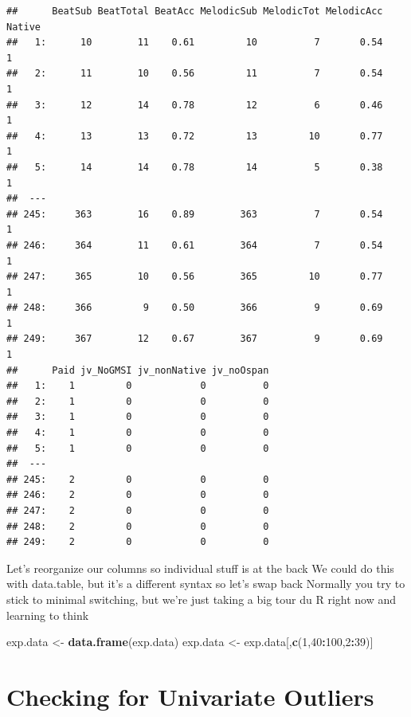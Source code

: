 \documentclass[]{book}
\newenvironment{Shaded}{\begin{snugshade}}{\end{snugshade}}
\newcommand{\KeywordTok}[1]{\textcolor[rgb]{0.13,0.29,0.53}{\textbf{#1}}}
\newcommand{\DecValTok}[1]{\textcolor[rgb]{0.00,0.00,0.81}{#1}}
\newcommand{\StringTok}[1]{\textcolor[rgb]{0.31,0.60,0.02}{#1}}
\newcommand{\OperatorTok}[1]{\textcolor[rgb]{0.81,0.36,0.00}{\textbf{#1}}}
\newcommand{\NormalTok}[1]{#1}
\theoremstyle{definition}
\theoremstyle{definition}
\theoremstyle{definition}
\theoremstyle{remark}
\begin{document}
\begin{verbatim}
##      BeatSub BeatTotal BeatAcc MelodicSub MelodicTot MelodicAcc Native
##   1:      10        11    0.61         10          7       0.54      1
##   2:      11        10    0.56         11          7       0.54      1
##   3:      12        14    0.78         12          6       0.46      1
##   4:      13        13    0.72         13         10       0.77      1
##   5:      14        14    0.78         14          5       0.38      1
##  ---                                                                  
## 245:     363        16    0.89        363          7       0.54      1
## 246:     364        11    0.61        364          7       0.54      1
## 247:     365        10    0.56        365         10       0.77      1
## 248:     366         9    0.50        366          9       0.69      1
## 249:     367        12    0.67        367          9       0.69      1
##      Paid jv_NoGMSI jv_nonNative jv_noOspan
##   1:    1         0            0          0
##   2:    1         0            0          0
##   3:    1         0            0          0
##   4:    1         0            0          0
##   5:    1         0            0          0
##  ---                                       
## 245:    2         0            0          0
## 246:    2         0            0          0
## 247:    2         0            0          0
## 248:    2         0            0          0
## 249:    2         0            0          0
\end{verbatim}

Let's reorganize our columns so individual stuff is at the back We could
do this with data.table, but it's a different syntax so let's swap back
Normally you try to stick to minimal switching, but we're just taking a
big tour du R right now and learning to think

\begin{Shaded}
\begin{Highlighting}[]
\NormalTok{exp.data <-}\StringTok{ }\KeywordTok{data.frame}\NormalTok{(exp.data)}
\NormalTok{exp.data <-}\StringTok{ }\NormalTok{exp.data[,}\KeywordTok{c}\NormalTok{(}\DecValTok{1}\NormalTok{,}\DecValTok{40}\OperatorTok{:}\DecValTok{100}\NormalTok{,}\DecValTok{2}\OperatorTok{:}\DecValTok{39}\NormalTok{)]}
\end{Highlighting}
\end{Shaded}

\section{Checking for Univariate
Outliers}\label{checking-for-univariate-outliers}
\end{document}

